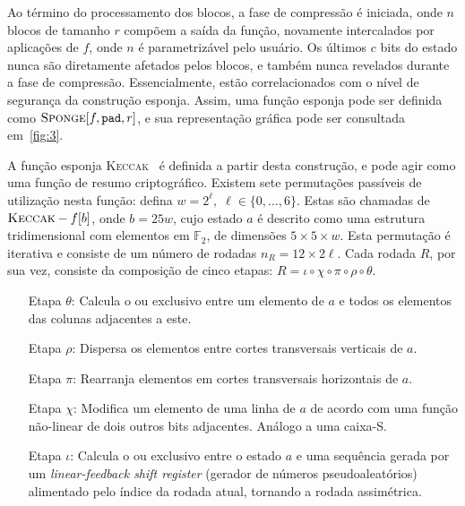 \documentclass[12pt,notitlepage]{report}
\begin{document}
Ao término do processamento dos blocos, a fase de compressão é iniciada, onde
$n$ blocos de tamanho $r$ compõem a saída da função, novamente intercalados por
aplicações de $f$, onde $n$ é parametrizável pelo usuário. Os últimos $c$ bits
do estado nunca são diretamente afetados pelos blocos, e também nunca revelados
durante a fase de compressão. Essencialmente, estão correlacionados com o nível
de segurança da construção esponja. Assim, uma função esponja pode ser definida
como $\textsc{Sponge}[f, \texttt{pad}, r]$, e sua representação gráfica pode
ser consultada em~\ref{fig:3}.

A função esponja \textsc{Keccak}~\cite{KeccakReference} é definida a partir
desta construção, e pode agir como uma função de resumo criptográfico. Existem
sete permutações passíveis de utilização nesta função: defina $w = 2^{\ell}, \;
\ell \in \{0, \dots, 6\}$.  Estas são chamadas de $\textsc{Keccak}-f[b]$, onde
$b = 25w$, cujo estado $a$ é descrito como uma estrutura tridimensional com
elementos em $\mathbb{F}_2$, de dimensões $5 \times 5 \times w$. Esta
permutação é iterativa e consiste de um número de rodadas
$n_R = 12 \times 2 \ell$. Cada rodada $R$, por sua vez, consiste da composição
de cinco etapas: $R = \iota \circ \chi \circ \pi \circ \rho \circ \theta$.

\begin{enumerate}

  \item[Etapa $\theta$:] Calcula o ou exclusivo entre um elemento de $a$ e
      todos os elementos das colunas adjacentes a este.

  \item[Etapa $\rho$:] Dispersa os elementos entre cortes transversais
      verticais de $a$.

  \item[Etapa $\pi$:] Rearranja elementos em cortes transversais horizontais de
      $a$.

  \item[Etapa $\chi$:] Modifica um elemento de uma linha de $a$ de acordo com
      uma função não-linear de dois outros bits adjacentes. Análogo a uma
        caixa-S.

  \item[Etapa $\iota$:] Calcula o ou exclusivo entre o estado $a$ e uma
      sequência gerada por um \emph{linear-feedback shift register}
      (gerador de números pseudoaleatórios) alimentado
        pelo índice da rodada atual, tornando a rodada assimétrica.

\end{enumerate}
\end{document}

